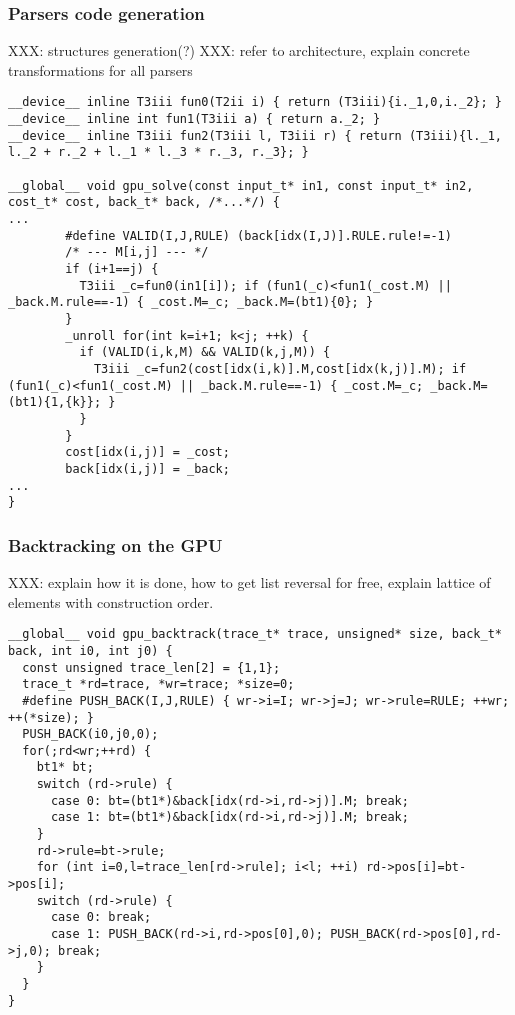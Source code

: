 \subsubsection{Parsers code generation}
XXX: structures generation(?)
XXX: refer to architecture, explain concrete transformations for all parsers

\begin{verbatim}
__device__ inline T3iii fun0(T2ii i) { return (T3iii){i._1,0,i._2}; }
__device__ inline int fun1(T3iii a) { return a._2; }
__device__ inline T3iii fun2(T3iii l, T3iii r) { return (T3iii){l._1, l._2 + r._2 + l._1 * l._3 * r._3, r._3}; }

__global__ void gpu_solve(const input_t* in1, const input_t* in2, cost_t* cost, back_t* back, /*...*/) {
...
        #define VALID(I,J,RULE) (back[idx(I,J)].RULE.rule!=-1)
        /* --- M[i,j] --- */
        if (i+1==j) {
          T3iii _c=fun0(in1[i]); if (fun1(_c)<fun1(_cost.M) || _back.M.rule==-1) { _cost.M=_c; _back.M=(bt1){0}; }
        }
        _unroll for(int k=i+1; k<j; ++k) {
          if (VALID(i,k,M) && VALID(k,j,M)) {
            T3iii _c=fun2(cost[idx(i,k)].M,cost[idx(k,j)].M); if (fun1(_c)<fun1(_cost.M) || _back.M.rule==-1) { _cost.M=_c; _back.M=(bt1){1,{k}}; }
          }
        }
        cost[idx(i,j)] = _cost;
        back[idx(i,j)] = _back;
...
}
\end{verbatim}

\subsubsection{Backtracking on the GPU}
XXX: explain how it is done, how to get list reversal for free, explain lattice of elements with construction order.

\begin{verbatim}
__global__ void gpu_backtrack(trace_t* trace, unsigned* size, back_t* back, int i0, int j0) {
  const unsigned trace_len[2] = {1,1};
  trace_t *rd=trace, *wr=trace; *size=0;
  #define PUSH_BACK(I,J,RULE) { wr->i=I; wr->j=J; wr->rule=RULE; ++wr; ++(*size); }
  PUSH_BACK(i0,j0,0);
  for(;rd<wr;++rd) {
    bt1* bt;
    switch (rd->rule) {
      case 0: bt=(bt1*)&back[idx(rd->i,rd->j)].M; break;
      case 1: bt=(bt1*)&back[idx(rd->i,rd->j)].M; break;
    }
    rd->rule=bt->rule;
    for (int i=0,l=trace_len[rd->rule]; i<l; ++i) rd->pos[i]=bt->pos[i];
    switch (rd->rule) {
      case 0: break;
      case 1: PUSH_BACK(rd->i,rd->pos[0],0); PUSH_BACK(rd->pos[0],rd->j,0); break;
    }
  }
}
\end{verbatim}

